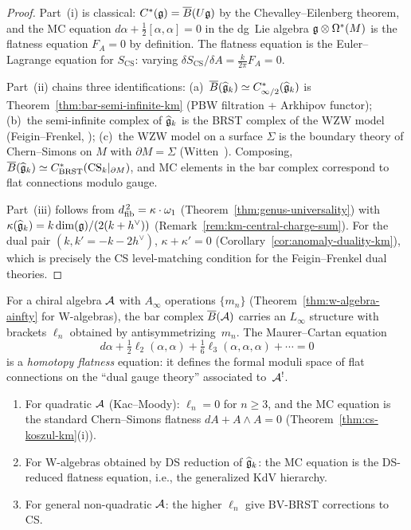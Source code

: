 \begin{proof}
Part~(i) is classical: $C^*(\mathfrak{g}) = \overline{B}(U\mathfrak{g})$ by the
Chevalley--Eilenberg theorem, and the MC equation
$d\alpha + \frac{1}{2}[\alpha, \alpha] = 0$ in the dg~Lie algebra
$\mathfrak{g} \otimes \Omega^*(M)$ is the flatness equation $F_A = 0$ by
definition.  The flatness equation is the Euler--Lagrange equation
for $S_{\mathrm{CS}}$: varying $\delta S_{\mathrm{CS}}/\delta A
= \frac{k}{2\pi} F_A = 0$.

Part~(ii) chains three identifications:
(a)~$\overline{B}(\widehat{\mathfrak{g}}_k) \simeq C^*_{\infty/2}(\widehat{\mathfrak{g}}_k)$
is Theorem~\ref{thm:bar-semi-infinite-km} (PBW filtration +
Arkhipov functor);
(b)~the semi-infinite complex of $\widehat{\mathfrak{g}}_k$ is the BRST
complex of the WZW model (Feigin--Frenkel, \cite{FF});
(c)~the WZW model on a surface $\Sigma$ is the boundary theory
of Chern--Simons on $M$ with $\partial M = \Sigma$
(Witten~\cite{Wit89}).
Composing, $\overline{B}(\widehat{\mathfrak{g}}_k) \simeq C^*_{\mathrm{BRST}}
(\mathrm{CS}_k|_{\partial M})$, and MC elements in the bar complex
correspond to flat connections modulo gauge.

Part~(iii) follows from
$d_{\mathrm{fib}}^{\,2} = \kappa \cdot \omega_1$
(Theorem~\ref{thm:genus-universality}) with
$\kappa(\widehat{\mathfrak{g}}_k) = k\dim(\mathfrak{g})/(2(k+h^\vee))$
(Remark~\ref{rem:km-central-charge-sum}).  For the dual pair
$(k, k' = -k-2h^\vee)$,
$\kappa + \kappa' = 0$
(Corollary~\ref{cor:anomaly-duality-km}), which is precisely
the CS level-matching condition for the Feigin--Frenkel dual
theories.
\end{proof}

\begin{theorem}
\label{thm:linf-mc-flatness}
For a chiral algebra $\mathcal{A}$ with $A_\infty$ operations
$\{m_n\}$ \textup{(}Theorem~\textup{\ref{thm:w-algebra-ainfty}}
for W-algebras\textup{)}, the bar complex $\overline{B}(\mathcal{A})$
carries an $L_\infty$ structure with brackets $\ell_n$
obtained by antisymmetrizing~$m_n$.  The Maurer--Cartan
equation
\[
d\alpha + \tfrac{1}{2}\ell_2(\alpha, \alpha)
+ \tfrac{1}{6}\ell_3(\alpha, \alpha, \alpha)
+ \cdots = 0
\]
is a \emph{homotopy flatness} equation: it defines the
formal moduli space of flat connections on the
``dual gauge theory'' associated to~$\mathcal{A}^!$.
\begin{enumerate}[label=\textup{(\roman*)}]
\item For quadratic $\mathcal{A}$
  \textup{(}Kac--Moody\textup{)}: $\ell_n = 0$ for
  $n \geq 3$, and the MC equation is the standard
  Chern--Simons flatness $dA + A \wedge A = 0$
  \textup{(}Theorem~\textup{\ref{thm:cs-koszul-km}(i))}.
\item For W-algebras obtained by DS reduction of
  $\widehat{\mathfrak{g}}_k$: the MC equation is the
  DS-reduced flatness equation, i.e., the generalized
  KdV hierarchy.
\item For general non-quadratic $\mathcal{A}$: the higher
  $\ell_n$ give BV-BRST corrections to CS.
\end{enumerate}
\end{theorem}

